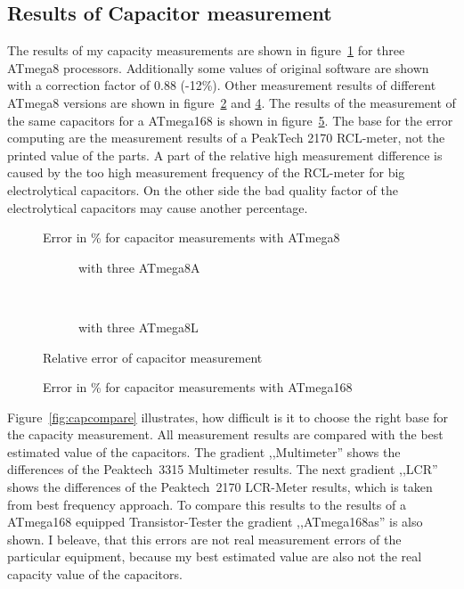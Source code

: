 \subsection{Results of Capacitor measurement}
The results of my capacity measurements are shown in figure~\ref{fig:mega8cap} for three ATmega8 processors.
Additionally some values of original software are shown with a correction factor of 0.88 (-12\%).
Other measurement results of different ATmega8 versions are shown in figure~\ref{fig:mega8Acap} and \ref{fig:mega8Lcap}.
The results of the measurement of the same capacitors for a ATmega168 is shown in figure~\ref{fig:mega168cap}.
The base for the error computing are the measurement results of a PeakTech 2170 RCL-meter, not the printed value
of the parts.
A part of the relative high measurement difference is caused by the too high measurement frequency of the RCL-meter for big
electrolytical capacitors. On the other side the bad quality factor of the electrolytical capacitors may cause
another percentage.

\begin{figure}[H]
\centering

\caption{Error in \% for capacitor measurements with ATmega8 }
\label{fig:mega8cap}
\end{figure}

\begin{figure}[H]
  \begin{subfigure}[b]{9cm}
    \centering
    \resizebox{9cm}{!}{}
    \caption{with three ATmega8A}
    \label{fig:mega8Acap}
  \end{subfigure}
  ~
  \begin{subfigure}[b]{9cm}
    \centering
    \resizebox{9cm}{!}{}
    \caption{with three ATmega8L}
    \label{fig:mega8Lcap}
  \end{subfigure}
  \caption{Relative error of capacitor measurement}
\end{figure}

\begin{figure}[H]
\centering

\caption{Error in \% for capacitor measurements with ATmega168 }
\label{fig:mega168cap}
\end{figure}

Figure~\ref{fig:capcompare} illustrates, how difficult is it to choose the right base for the capacity measurement.
All measurement results are compared with the best estimated value of the capacitors.
The gradient ,,Multimeter'' shows the differences of the Peaktech~3315 Multimeter results.
The next gradient ,,LCR'' shows the differences of the Peaktech~2170 LCR-Meter results, which is taken from best frequency approach.
To compare this results to the results of a ATmega168 equipped Transistor-Tester the gradient ,,ATmega168as'' is also shown.
I beleave, that this errors are not real measurement errors of the particular equipment, because my best estimated value are
also not the real capacity value of the capacitors.

